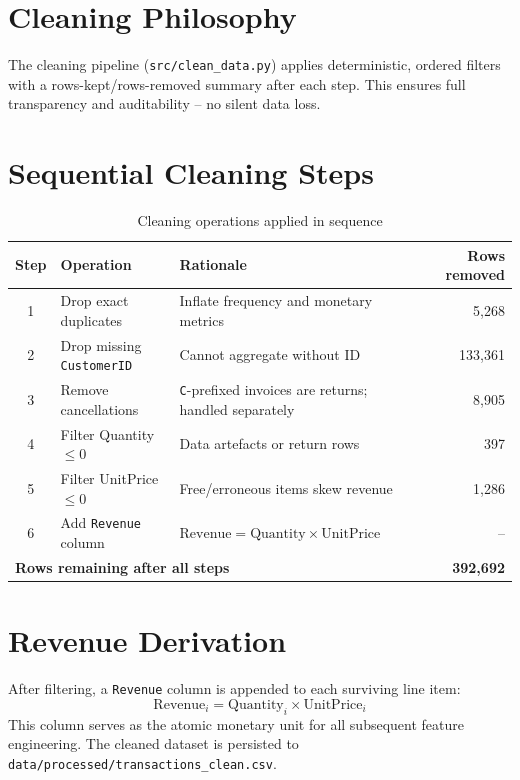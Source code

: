 \documentclass[12pt,a4paper]{report}
\begin{document}
\section{Cleaning Philosophy}

The cleaning pipeline (\texttt{src/clean\_data.py}) applies deterministic, ordered filters with a rows-kept/rows-removed summary after each step. This ensures full transparency and auditability -- no silent data loss.

\section{Sequential Cleaning Steps}

\begin{table}[H]
\centering
\caption{Cleaning operations applied in sequence}
\begin{tabularx}{\textwidth}{clXr}
\toprule
\textbf{Step} & \textbf{Operation} & \textbf{Rationale} & \textbf{Rows removed} \\
\midrule
1 & Drop exact duplicates & Inflate frequency and monetary metrics & 5,268 \\
2 & Drop missing \texttt{CustomerID} & Cannot aggregate without ID & 133,361 \\
3 & Remove cancellations & \texttt{C}-prefixed invoices are returns; handled separately & 8,905 \\
4 & Filter Quantity $\le 0$ & Data artefacts or return rows & 397 \\
5 & Filter UnitPrice $\le 0$ & Free/erroneous items skew revenue & 1,286 \\
6 & Add \texttt{Revenue} column & $\text{Revenue} = \text{Quantity} \times \text{UnitPrice}$ & -- \\
\midrule
\multicolumn{3}{l}{\textbf{Rows remaining after all steps}} & \textbf{392,692} \\
\bottomrule
\end{tabularx}
\end{table}

\section{Revenue Derivation}

After filtering, a \texttt{Revenue} column is appended to each surviving line item:
\[
\text{Revenue}_i = \text{Quantity}_i \times \text{UnitPrice}_i
\]
This column serves as the atomic monetary unit for all subsequent feature engineering. The cleaned dataset is persisted to \texttt{data/processed/transactions\_clean.csv}.
\end{document}
